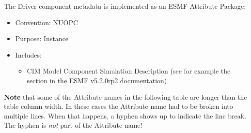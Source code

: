 \label{DriverCompMeta}
The Driver component metadata is implemented as an ESMF Attribute Package:

\begin{itemize}
    \item Convention: NUOPC
    \item Purpose: Instance
    \item Includes:
    \begin{itemize}
      \item CIM Model Component Simulation Description (see for example the  section in the ESMF v5.2.0rp2 documentation)
    \end{itemize} 
\end{itemize}

{\bf Note} that some of the Attribute names in the following table are longer than the table column width. In these cases the
Attribute name had to be broken into multiple lines. When that happens, a hyphen shows up to indicate the line break. The hyphen
is {\em not} part of the Attribute name!

